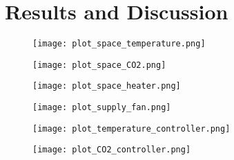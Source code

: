 \section{Results and Discussion}
\label{sec:results_and_discussion}

\def\distanceToCaption{-7}
\begin{figure*}
     \centering
     \begin{subfigure}{0.45\linewidth}
         \centering
         \texttt{[image: plot\_space\_temperature.png]}
         \vspace*{\distanceToCaption mm}
         \caption{}
         \label{fig:}
     \end{subfigure}
     \begin{subfigure}{0.45\linewidth}
         \centering
         \texttt{[image: plot\_space\_CO2.png]}
         \vspace*{\distanceToCaption mm}
         \caption{}
         \label{fig:}
     \end{subfigure}
     
     \begin{subfigure}{0.45\linewidth}
         \centering
         \texttt{[image: plot\_space\_heater.png]}
         \vspace*{\distanceToCaption mm}
         \caption{}
         \label{fig:}
     \end{subfigure}
          \begin{subfigure}{0.45\linewidth}
         \centering
         \texttt{[image: plot\_supply\_fan.png]}
         \vspace*{\distanceToCaption mm}
         \caption{}
         \label{fig:}
     \end{subfigure}
     
     \begin{subfigure}{0.45\linewidth}
         \centering
         \texttt{[image: plot\_temperature\_controller.png]}
         \vspace*{\distanceToCaption mm}
         \caption{}
         \label{fig:}
     \end{subfigure}
     \begin{subfigure}{0.45\linewidth}
         \centering
         \texttt{[image: plot\_CO2\_controller.png]}
         \vspace*{\distanceToCaption mm}
         \caption{}
         \label{fig:}
     \end{subfigure}
     

\end{figure*}
